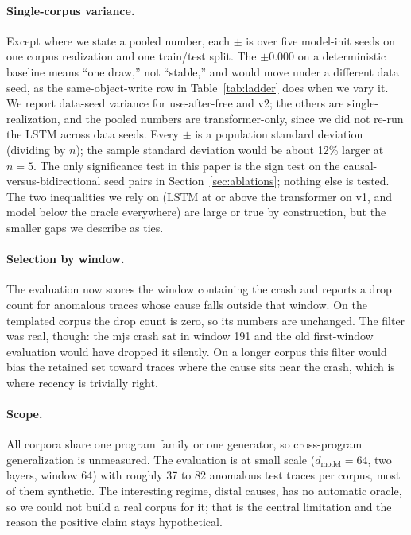 \documentclass[11pt]{article}
\newcommand{\dmodel}{\ensuremath{d_{\text{model}}}}
\begin{document}
\paragraph{Single-corpus variance.}
Except where we state a pooled number, each $\pm$ is over five model-init seeds on one corpus realization and one train/test split. The $\pm 0.000$ on a deterministic baseline means ``one draw,'' not ``stable,'' and would move under a different data seed, as the same-object-write row in Table~\ref{tab:ladder} does when we vary it. We report data-seed variance for use-after-free and v2; the others are single-realization, and the pooled numbers are transformer-only, since we did not re-run the LSTM across data seeds. Every $\pm$ is a population standard deviation (dividing by $n$); the sample standard deviation would be about 12\% larger at $n = 5$. The only significance test in this paper is the sign test on the causal-versus-bidirectional seed pairs in Section~\ref{sec:ablations}; nothing else is tested. The two inequalities we rely on (LSTM at or above the transformer on v1, and model below the oracle everywhere) are large or true by construction, but the smaller gaps we describe as ties.

\paragraph{Selection by window.}
The evaluation now scores the window containing the crash and reports a drop count for anomalous traces whose cause falls outside that window. On the templated corpus the drop count is zero, so its numbers are unchanged. The filter was real, though: the mjs crash sat in window 191 and the old first-window evaluation would have dropped it silently. On a longer corpus this filter would bias the retained set toward traces where the cause sits near the crash, which is where recency is trivially right.

\paragraph{Scope.}
All corpora share one program family or one generator, so cross-program generalization is unmeasured. The evaluation is at small scale (\dmodel${}=64$, two layers, window 64) with roughly 37 to 82 anomalous test traces per corpus, most of them synthetic. The interesting regime, distal causes, has no automatic oracle, so we could not build a real corpus for it; that is the central limitation and the reason the positive claim stays hypothetical.
\end{document}
